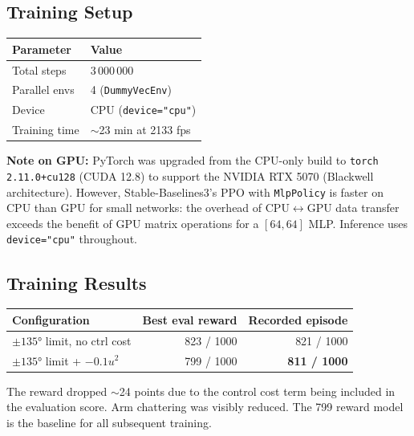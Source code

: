 \documentclass[12pt,a4paper]{article}
\begin{document}
\subsection{Training Setup}

\begin{center}
\begin{tabular}{ll}
\toprule
\textbf{Parameter} & \textbf{Value} \\
\midrule
Total steps     & 3\,000\,000 \\
Parallel envs   & 4 (\texttt{DummyVecEnv}) \\
Device          & CPU (\texttt{device="cpu"}) \\
Training time   & $\sim$23 min at 2133 fps \\
\bottomrule
\end{tabular}
\end{center}

\noindent \textbf{Note on GPU:} PyTorch was upgraded from the CPU-only build to
\texttt{torch 2.11.0+cu128} (CUDA 12.8) to support the NVIDIA RTX 5070
(Blackwell architecture). However, Stable-Baselines3's PPO with
\texttt{MlpPolicy} is faster on CPU than GPU for small networks: the
overhead of CPU$\leftrightarrow$GPU data transfer exceeds the benefit of
GPU matrix operations for a $[64, 64]$ MLP. Inference uses \texttt{device="cpu"}
throughout.

\subsection{Training Results}

\begin{center}
\begin{tabular}{lrr}
\toprule
\textbf{Configuration} & \textbf{Best eval reward} & \textbf{Recorded episode} \\
\midrule
$\pm135°$ limit, no ctrl cost & 823 / 1000 & 821 / 1000 \\
$\pm135°$ limit + $-0.1u^2$   & 799 / 1000 & \textbf{811 / 1000} \\
\bottomrule
\end{tabular}
\end{center}

\noindent The reward dropped $\sim$24 points due to the control cost term
being included in the evaluation score. Arm chattering was visibly reduced.
The 799 reward model is the baseline for all subsequent training.

\end{document}
